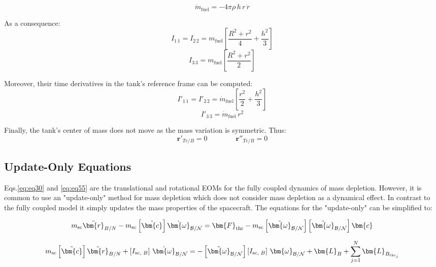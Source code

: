 \begin{equation}
	\dot{m}_\text{fuel} = - 4\pi\rho\,h\,r\,\dot{r}
\end{equation}

As a consequence:
\begin{equation}
	I_{1\,1} = I_{2\,2} = m_\text{fuel}\left[\frac{R^2+ r^2}{4} +\frac{h^2}{3}\right]
\end{equation}
\begin{equation}
	I_{3\,3} = m_\text{fuel}\left[\frac{R^2+ r^2}{2} \right]
\end{equation}

Moreover, their time derivatives in the tank's reference frame can be computed:
\begin{equation}
	I'_{1\,1} = I'_{2\,2} = \dot{m}_\text{fuel}\left[\frac{r^2}{2}+\frac{h^2}{3}\right]
\end{equation}
\begin{equation}
	I'_{3\,3}  = \dot{m}_\text{fuel}\,r^2
\end{equation}

Finally, the tank's center of mass does not move as the mass variation is symmetric. Thus:
\begin{equation}
	\bm{r}'_{Tc/B} = 0 \qquad\qquad \bm{r}''_{Tc/B}=0
\end{equation}

\subsection{Update-Only Equations}

Eqs.\eqref{eq:eq30} and \eqref{eq:eq55} are the translational and rotational EOMs for the fully coupled dynamics of mass depletion. However, it is common to use an "update-only" method for mass depletion which does not consider mass depletion as a dynamical effect. In contrast to the fully coupled model it simply updates the mass properties of the spacecraft. The equations for the "update-only" can be simplified to:

\begin{equation}\label{eq:eq31}
m_{\text{sc}} \ddot{\bm{r}}_{B/N} - m_{\text{sc}} \left[\tilde{\bm{c}}\right]\dot{\bm{\omega}}_{\cal{B}/\cal{N}} =  \bm{F}_{\text{thr}} - m_{\text{sc}} \left[\tilde{\bm{\omega}}_{\cal{B}/\cal{N}}\right] \left[\tilde{\bm{\omega}}_{\cal{B}/\cal{N}}\right] \bm{c}
\end{equation}

\begin{equation}\label{eq:eq55}
m_{\text{sc}} \left[\tilde{\bm{c}}\right]\ddot{\bm{r}}_{B/N} + \left[I_{\text{sc, }B}\right]\,\dot{\bm{\omega}}_{\cal{B}/\cal{N}} = - \left[\tilde{\bm{\omega}}_{\cal{B}/\cal{N}}\right]\left[I_{\text{sc, }B}\right]\,\bm{\omega}_{\cal{B}/\cal{N}}
+ \bm{L}_{B} + \sum_{j=1}^{N}\bm{L}_{B_{\text{thr}_j}}
\end{equation}
